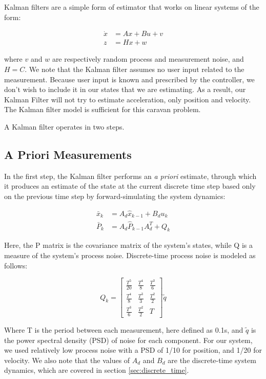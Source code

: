\documentclass[12pt,onecolumn,reqno]{amsart}
\begin{document}
Kalman filters are a simple form of estimator that works on linear systems of the form:

\begin{align*}
    \dot{x} &= A x + B u + v \\
    z &= Hx + w
\end{align*}

where $v$ and $w$ are respectively random process and measurement noise, and $H
= C$. We note that the Kalman filter assumes no user input related to the
measurement.  Because user input is known and prescribed by the controller, we
don't wish to include it in our states that we are estimating. As a result, our
Kalman Filter will not try to estimate acceleration, only position and velocity.
The Kalman filter model is sufficient for this caravan problem.

A Kalman filter operates in two steps. 

\subsection{A Priori Measurements}
In the first step, the Kalman filter performs an \textit{a priori} estimate, through which
it produces an estimate of the state at the current discrete time step based
only on the previous time step by forward-simulating the system dynamics:

\begin{align*}
  \bar{x}_{k} &= A_{d} \hat{x}_{k-1} + B_{d} u_{k} \\
  \bar{P}_{k} &= A_{d} \hat{P}_{k-1} A_{d}^{T} + Q_{k}
\end{align*}

Here, the P matrix is the covariance matrix of the system's states, while Q is a
measure of the system's process noise. Discrete-time process noise is modeled
as follows:

\begin{equation*}
  \renewcommand*{\arraystretch}{2}
    Q_{k} = 
  \begin{bmatrix}
    \frac{T^5}{20} & \frac{T^4}{8} & \frac{T^3}{6} \\
    \frac{T^4}{8} & \frac{T^3}{3} & \frac{T^2}{2} \\
    \frac{T^3}{6} & \frac{T^2}{2} & T
  \end{bmatrix}
  \tilde{q}
\end{equation*}

Where T is the period between each measurement, here defined as 0.1s, and
$\tilde{q}$  is the power spectral density (PSD) of noise for each component.
For our system, we used relatively low process noise with a PSD of 1/10 for
position, and 1/20 for velocity. We also note that the values of $A_d$ and $B_d$
are the discrete-time system dynamics, which are covered in
section \ref{sec:discrete_time}.
\end{document}
